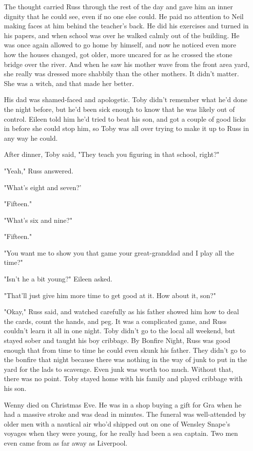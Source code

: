 The thought carried Russ through the rest of the day and gave him an inner dignity that he could see, even if no one else could. He paid no attention to Neil making faces at him behind the teacher's back. He did his exercises and turned in his papers, and when school was over he walked calmly out of the building. He was once again allowed to go home by himself, and now he noticed even more how the houses changed, got older, more uncared for as he crossed the stone bridge over the river. And when he saw his mother wave from the front area yard, she really was dressed more shabbily than the other mothers. It didn't matter. She was a witch, and that made her better.

His dad was shamed-faced and apologetic. Toby didn't remember what he'd done the night before, but he'd been sick enough to know that he was likely out of control. Eileen told him he'd tried to beat his son, and got a couple of good licks in before she could stop him, so Toby was all over trying to make it up to Russ in any way he could.

After dinner, Toby said, "They teach you figuring in that school, right?"

"Yeah," Russ answered.

"What's eight and seven?'

"Fifteen."

"What's six and nine?"

"Fifteen."

"You want me to show you that game your great-granddad and I play all the time?"

"Isn't he a bit young?" Eileen asked.

"That'll just give him more time to get good at it. How about it, son?"

"Okay," Russ said, and watched carefully as his father showed him how to deal the cards, count the hands, and peg. It was a complicated game, and Russ couldn't learn it all in one night. Toby didn't go to the local all weekend, but stayed sober and taught his boy cribbage. By Bonfire Night, Russ was good enough that from time to time he could even skunk his father. They didn't go to the bonfire that night because there was nothing in the way of junk to put in the yard for the lads to scavenge. Even junk was worth too much. Without that, there was no point. Toby stayed home with his family and played cribbage with his son.

Wenny died on Christmas Eve. He was in a shop buying a gift for Gra when he had a massive stroke and was dead in minutes. The funeral was well-attended by older men with a nautical air who'd shipped out on one of Wensley Snape's voyages when they were young, for he really had been a sea captain. Two men even came from as far away as Liverpool.

